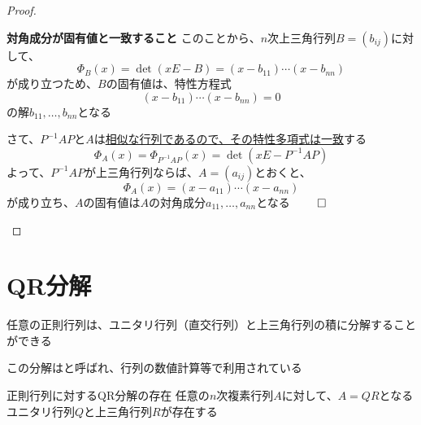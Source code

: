 \documentclass[../../../topic_linear-algebra]{subfiles}
\begin{document}
\begin{proof}
\begin{subpattern}{\bfseries 対角成分が固有値と一致すること}
    このことから、$n$次上三角行列$B = (b_{ij})$に対して、
    \begin{equation*}
      \Phi_B(x) = \det(xE - B) = (x-b_{11})\cdots (x-b_{nn})
    \end{equation*}
    が成り立つため、$B$の固有値は、特性方程式
    \begin{equation*}
      (x-b_{11})\cdots (x-b_{nn}) = 0
    \end{equation*}
    の解$b_{11},\ldots,b_{nn}$となる

    \br

    さて、$P^{-1}AP$と$A$は\hyperref[thm:char-poly-of-similar-matrices]{相似な行列であるので、その特性多項式は一致}する
    \begin{equation*}
      \Phi_A(x) = \Phi_{P^{-1}AP}(x) = \det(xE - P^{-1}AP)
    \end{equation*}
    よって、$P^{-1}AP$が上三角行列ならば、$A = (a_{ij})$とおくと、
    \begin{equation*}
      \Phi_A(x) = (x - a_{11})\cdots (x - a_{nn})
    \end{equation*}
    が成り立ち、$A$の固有値は$A$の対角成分$a_{11},\ldots,a_{nn}$となる $\qed$
  \end{subpattern}
\end{proof}

\sectionline
\section{QR分解}

任意の正則行列は、ユニタリ行列（直交行列）と上三角行列の積に分解することができる

この分解はと呼ばれ、行列の数値計算等で利用されている

\begin{theorem}{正則行列に対するQR分解の存在}
  任意の$n$次複素行列$A$に対して、$A=QR$となるユニタリ行列$Q$と上三角行列$R$が存在する
\end{theorem}
\end{document}

